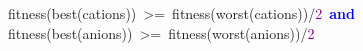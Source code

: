 \noindent
\mbox{}\ \ \ \ fitness\textcolor{BrickRed}{(}best\textcolor{BrickRed}{(}cations\textcolor{BrickRed}{))}\ \textcolor{BrickRed}{\textgreater{}=}\ fitness\textcolor{BrickRed}{(}worst\textcolor{BrickRed}{(}cations\textcolor{BrickRed}{))/}\textcolor{Purple}{2}\ \textbf{\textcolor{Blue}{and}} \\
\mbox{}\ \ \ \ fitness\textcolor{BrickRed}{(}best\textcolor{BrickRed}{(}anions\textcolor{BrickRed}{))}\ \textcolor{BrickRed}{\textgreater{}=}\ fitness\textcolor{BrickRed}{(}worst\textcolor{BrickRed}{(}anions\textcolor{BrickRed}{))/}\textcolor{Purple}{2} \\
\mbox{}
